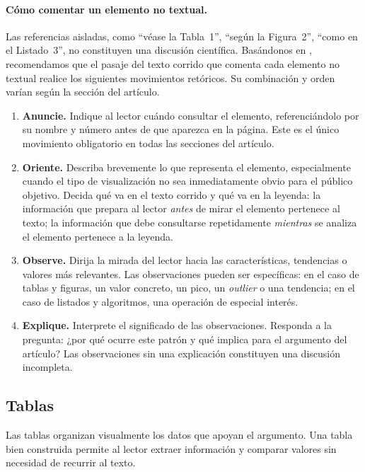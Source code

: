 \documentclass[spanish]{rbie2026}%
\begin{document}
\paragraph{Cómo comentar un elemento no textual.} Las referencias aisladas, como ``véase la Tabla~1'', ``según la Figura~2'', ``como en el Listado~3'', no constituyen una discusión científica. Basándonos en \citet{Moskovitz2023}, recomendamos que el pasaje del texto corrido que comenta cada elemento no textual realice los siguientes movimientos retóricos. Su combinación y orden varían según la sección del artículo.

\begin{enumerate}
  \item \textbf{Anuncie.} Indique al lector cuándo consultar el elemento, referenciándolo por su nombre y número antes de que aparezca en la página. Este es el único movimiento obligatorio en todas las secciones del artículo.

  \item \textbf{Oriente.} Describa brevemente lo que representa el elemento, especialmente cuando el tipo de visualización no sea inmediatamente obvio para el público objetivo. Decida qué va en el texto corrido y qué va en la leyenda: la información que prepara al lector \textit{antes} de mirar el elemento pertenece al texto; la información que debe consultarse repetidamente \textit{mientras} se analiza el elemento pertenece a la leyenda.

  \item \textbf{Observe.} Dirija la mirada del lector hacia las características, tendencias o valores más relevantes. Las observaciones pueden ser específicas: en el caso de tablas y figuras, un valor concreto, un pico, un \textit{outlier} o una tendencia; en el caso de listados y algoritmos, una operación de especial interés.

  \item \textbf{Explique.} Interprete el significado de las observaciones. Responda a la pregunta: ¿por qué ocurre este patrón y qué implica para el argumento del artículo? Las observaciones sin una explicación constituyen una discusión incompleta.
\end{enumerate}


\subsection{Tablas}

Las tablas organizan visualmente los datos que apoyan el argumento. Una tabla bien construida permite al lector extraer información y comparar valores sin necesidad de recurrir al texto.
\end{document}
